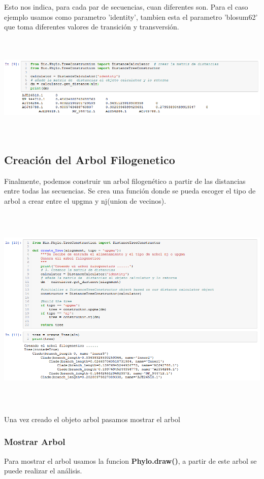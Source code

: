\documentclass[a4paper]{article}
\begin{document}
Esto nos indica, para cada par de secuencias, cuan diferentes son.
Para el caso ejemplo usamos como parametro 'identity', tambien esta el parametro 'blosum62' que toma diferentes valores de transición y transversión. 
\begin{center}
	\includegraphics[width=16cm,height=5cm]{matriz.png}
\end{center}

\subsection{Creación del Arbol Filogenetico}
Finalmente, podemos construir un arbol filogenético a partir de las distancias entre todas las secuencias.
Se crea una función donde se pueda escoger el tipo de arbol a crear entre el upgma y nj(union de vecinos).

\begin{center}
	\includegraphics[width=16cm,height=10cm]{CrearArbol.png}
\end{center}
Una vez creado el objeto arbol pasamos mostrar el arbol

\subsubsection*{Mostrar Arbol}
Para mostrar el arbol usamos la funcion \textbf{Phylo.draw()}, a partir de este arbol se puede realizar el análisis.
 
\end{document}
